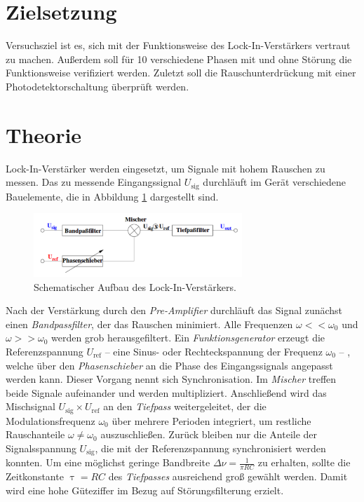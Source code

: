 \section{Zielsetzung}

Versuchsziel ist es, sich mit der Funktionsweise des Lock-In-Verstärkers vertraut zu machen. 
Außerdem soll für 10 verschiedene Phasen mit und ohne Störung die Funktionsweise verifiziert werden. 
Zuletzt soll die Rauschunterdrückung mit einer Photodetektorschaltung überprüft werden.

\section{Theorie}
\label{sec:Theorie}
Lock-In-Verstärker werden eingesetzt, um Signale mit hohem Rauschen zu messen. 
%
Das zu messende Eingangssignal $U_\mathup{sig}$ durchläuft im Gerät verschiedene Bauelemente, die in Abbildung \ref{fig:lockin} dargestellt sind.
\begin{figure}
	\centering
		\includegraphics[width=0.7\textwidth]{Bilder/LOCK_IN.pdf}
		\caption{Schematischer Aufbau des Lock-In-Verstärkers. \cite{V303}}
		\label{fig:lockin}
	\end{figure}

Nach der Verstärkung durch den \emph{Pre-Amplifier} durchläuft das Signal zunächst einen \emph{Bandpassfilter}, der das Rauschen minimiert. 
Alle Frequenzen $\omega<<\omega_0$ und $\omega>>\omega_0$ werden grob herausgefiltert.
Ein \emph{Funktionsgenerator} erzeugt die Referenzspannung $U_\mathup{ref}$ -- eine Sinus- oder Rechteckspannung der Frequenz $\omega_0$ -- , welche über den \emph{Phasenschieber} an die Phase des Eingangssignals angepasst werden kann. 
Dieser Vorgang nennt sich Synchronisation.
Im \emph{Mischer} treffen beide Signale aufeinander und werden multipliziert. 
Anschließend wird das Mischsignal $U_\mathup{sig}\times U_\mathup{ref}$ an den \emph{Tiefpass} weitergeleitet, der die Modulationsfrequenz $\omega_0$ über mehrere Perioden integriert, um restliche Rauschanteile $\omega\neq\omega_0$ auszuschließen. 
Zurück bleiben nur die Anteile der Signalsspannung $U_\mathup{sig}$, die mit der Referenzspannung synchronisiert werden konnten.
Um eine möglichst geringe Bandbreite $\Delta{\nu}=\frac{1}{\pi RC}$ zu erhalten, sollte die Zeitkonstante $\uptau=RC$ des \emph{Tiefpasses} ausreichend groß gewählt werden. 
Damit wird eine hohe Güteziffer im Bezug auf Störungsfilterung erzielt.

